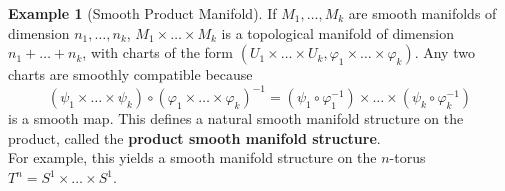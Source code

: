\documentclass[reqno]{amsart}
\theoremstyle{plain}%
\theoremstyle{definition}
\newtheorem{example}[theorem]{Example}
\theoremstyle{remark}
\begin{document}
        \begin{example}[Smooth Product Manifold]
            If $M_1, \ldots, M_k$ are smooth manifolds of dimension
            $n_1, \ldots, n_k$, $M_1 \times \ldots \times M_k$ is a topological
            manifold of dimension $n_1 + \ldots + n_k$, with charts of the form
            $\left( U_1 \times \ldots \times U_k, 
            \varphi_1 \times \ldots \times \varphi_k \right) $. Any two charts
            are smoothly compatible because
            \[
                \left( \psi_1 \times \ldots \times \psi_k \right) \circ
                \left( \varphi_1 \times \ldots \times \varphi_k \right)^{-1}
                =
                \left( \psi_1 \circ \varphi_1^{-1} \right) \times \ldots
                \times  \left( \psi_k \circ \varphi_k^{-1} \right) 
            \] 
            is a smooth map. This defines a natural smooth manifold structure
            on the product, called the \textbf{product smooth manifold
            structure}.\\
            For example, this yields a smooth manifold structure on the
            $n$-torus $T^{n} = S^{1} \times \ldots \times S^{1}$.
        \end{example}
\end{document}
